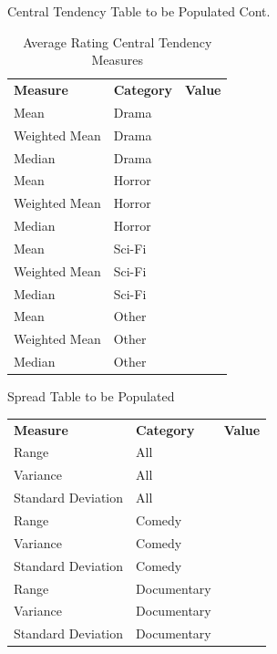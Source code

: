 \documentclass[pdf]{beamer}
\theoremstyle{remark}
\theoremstyle{definition}
\begin{document}
\begin{frame}[t]{Central Tendency Table to be Populated Cont.}
\begin{table}[htbp]
  \centering
  \captionsetup{justification=centering}
    \begin{tabular}{llr}
    \rowcolor[rgb]{ .851,  .882,  .949} \textbf{Measure} & \textbf{Category} & \multicolumn{1}{l}{\textbf{Value}} \\
    Mean  & Drama &  \\
    Weighted Mean & Drama &  \\
    Median & Drama &  \\
    Mean  & Horror &  \\
    Weighted Mean & Horror &  \\
    Median & Horror &  \\
    Mean  & Sci-Fi &  \\
    Weighted Mean & Sci-Fi &  \\
    Median & Sci-Fi &  \\
    Mean  & Other &  \\
    Weighted Mean & Other &  \\
    Median & Other &  \\
   \end{tabular}%
  \caption{Average Rating Central Tendency Measures}
  \label{tab:averageratingct}%
\end{table}%
\end{frame}

\begin{frame}[t]{Spread Table to be Populated}
\begin{table}[htbp]
  \centering
    \captionsetup{justification=centering}
    \begin{tabular}{llr}
    \rowcolor[rgb]{ .851,  .882,  .949} \textbf{Measure} & \textbf{Category} & \multicolumn{1}{l}{\textbf{Value}} \\
    Range  & All   &  \\
    Variance & All   &  \\
    Standard Deviation & All   &  \\
    Range  & Comedy &  \\
    Variance & Comedy &  \\
    Standard Deviation & Comedy &  \\
    Range  & Documentary &  \\
    Variance & Documentary &  \\
    Standard Deviation & Documentary &  \\
    \end{tabular}%
\end{table}%
\end{frame}
\end{document}
